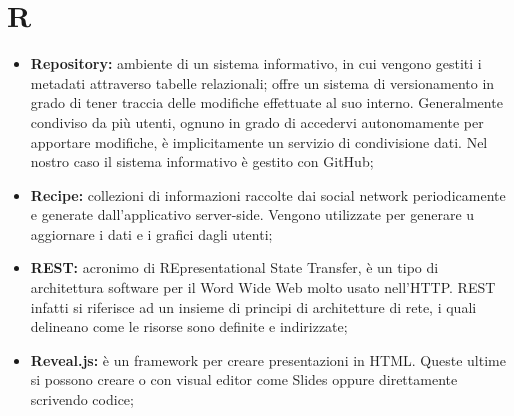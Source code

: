 \section*{R} %
\label{sec:r}
	\begin{itemize}
		\item \textbf{Repository:} ambiente di un sistema informativo, in cui vengono gestiti i metadati attraverso tabelle relazionali; offre un sistema di versionamento in grado di tener traccia delle modifiche effettuate al suo interno. Generalmente condiviso da più utenti, ognuno in grado di accedervi autonomamente per apportare modifiche, è implicitamente un servizio di condivisione dati. Nel nostro caso il sistema informativo è gestito con GitHub;	
		\item \textbf{Recipe:} collezioni di informazioni raccolte dai social network periodicamente e generate dall'applicativo server-side. Vengono utilizzate per generare u aggiornare i dati e i grafici dagli utenti;
		\item \textbf{REST:} acronimo di REpresentational State Transfer, è un tipo di architettura software per il Word Wide Web molto usato nell'HTTP. REST infatti si riferisce ad un insieme di principi di architetture di rete, i quali delineano come le risorse sono definite e indirizzate;
		\item \textbf{Reveal.js:} è un framework per creare presentazioni in HTML. Queste ultime si possono creare o con visual editor come Slides oppure direttamente scrivendo codice;
		\end{itemize}
\pagebreak


